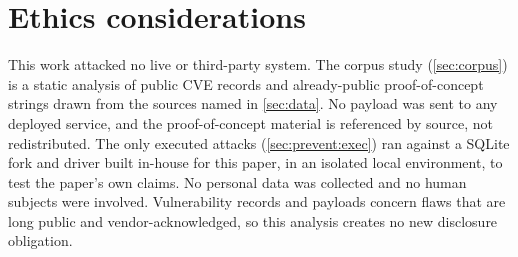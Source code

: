 \section{Ethics considerations}
\label{sec:appendix:ethics}

This work attacked no live or third-party system.
The corpus study (\cref{sec:corpus}) is a static analysis of public CVE records
and already-public proof-of-concept strings drawn from the sources named in
\cref{sec:data}.
No payload was sent to any deployed service, and the proof-of-concept material
is referenced by source, not redistributed.
The only executed attacks (\cref{sec:prevent:exec}) ran against a SQLite fork
and driver built in-house for this paper, in an isolated local environment, to
test the paper's own claims.
No personal data was collected and no human subjects were involved.
Vulnerability records and payloads concern flaws that are long public and
vendor-acknowledged, so this analysis creates no new disclosure obligation.
